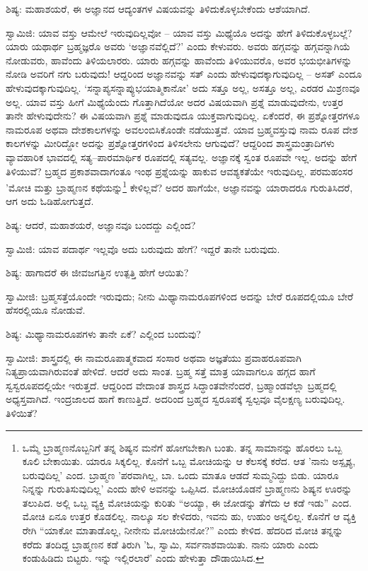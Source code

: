 ಶಿಷ್ಯ: ಮಹಾಶಯರೆ, ಈ ಅಜ್ಞಾನದ ಆದ್ಯಂತಗಳ ವಿಷಯವನ್ನು ತಿಳಿದುಕೊಳ್ಳಬೇಕೆಂದು ಆಶೆಯಾಗಿದೆ.

ಸ್ವಾಮಿಜಿ: ಯಾವ ವಸ್ತು ಆಮೇಲೆ ಇರುವುದಿಲ್ಲವೋ – ಯಾವ ವಸ್ತು ಮಿಥ್ಯೆಯೊ ಅದನ್ನು ಹೇಗೆ ತಿಳಿದುಕೊಳ್ಳಬಲ್ಲೆ? ಯಾರು ಯಥಾರ್ಥ ಬ್ರಹ್ಮಜ್ಞರೊ ಅವರು ‘ಅಜ್ಞಾನವೆಲ್ಲಿದೆ?’ ಎಂದು ಕೇಳುವರು. ಅವರು ಹಗ್ಗವನ್ನು ಹಗ್ಗವನ್ನಾಗಿಯೆ ನೋಡುವರು, ಹಾವೆಂದು ತಿಳಿಯಲಾರರು. ಯಾರು ಹಗ್ಗವನ್ನು ಹಾವೆಂದು ತಿಳಿಯುವರೊ, ಅವರ ಭಯಭೀತಿಗಳನ್ನು ನೋಡಿ ಅವರಿಗೆ ನಗು ಬರುವುದು! ಆದ್ದರಿಂದ ಅಜ್ಞಾನವನ್ನು ಸತ್ ಎಂದು ಹೇಳುವುದಕ್ಕಾಗುವುದಿಲ್ಲ – ಅಸತ್ ಎಂದೂ ಹೇಳುವುದಕ್ಕಾಗುವುದಿಲ್ಲ. ‘ಸನ್ನಾಪ್ಯಸನ್ನಾಪ್ಯುಭಯಾತ್ಮಿಕಾನೋ’ ಅದು ಸತ್ತೂ ಅಲ್ಲ, ಅಸತ್ತೂ ಅಲ್ಲ, ಎರಡರ ಮಿಶ್ರಣವೂ ಅಲ್ಲ. ಯಾವ ವಸ್ತು ಹೀಗೆ ಮಿಥ್ಯೆಯೆಂದು ಗೊತ್ತಾಗಿದೆಯೋ ಅದರ ವಿಷಯವಾಗಿ ಪ್ರಶ್ನೆ ಮಾಡುವುದೇನು, ಉತ್ತರ ತಾನೇ ಹೇಳುವುದೇನು? ಈ ವಿಷಯವಾಗಿ ಪ್ರಶ್ನೆ ಮಾಡುವುದೂ ಯುಕ್ತವಾಗುವುದಿಲ್ಲ. ಏಕೆಂದರೆ, ಈ ಪ್ರಶ್ನೋತ್ತರಗಳೂ ನಾಮರೂಪ ಅಥವಾ ದೇಶಕಾಲಗಳನ್ನು ಅವಲಂಬಿಸಿಕೊಂಡೇ ನಡೆಯುತ್ತವೆ. ಯಾವ ಬ್ರಹ್ಮವಸ್ತುವು ನಾಮ ರೂಪ ದೇಶ ಕಾಲಗಳನ್ನು ಮೀರಿದ್ದೋ ಅದನ್ನು ಪ್ರಶ್ನೋತ್ತರಗಳಿಂದ ತಿಳಿಸಲೇನು ಆಗುವುದೆ? ಆದ್ದರಿಂದ ಶಾಸ್ತ್ರಮಂತ್ರಾದಿಗಳು ವ್ಯಾವಹಾರಿಕ ಭಾವದಲ್ಲಿ ಸತ್ಯ–ಪಾರಮಾರ್ಥಿಕ ರೂಪದಲ್ಲಿ ಸತ್ಯವಲ್ಲ. ಅಜ್ಞಾನಕ್ಕೆ ಸ್ವಂತ ರೂಪವೇ ಇಲ್ಲ. ಅದನ್ನು ಹೇಗೆ ತಿಳಿಯುವೆ? ಬ್ರಹ್ಮದ ಪ್ರಕಾಶವಾದಾಗಂತೂ ಇಂಥ ಪ್ರಶ್ನೆಯನ್ನು ಹಾಕುವ ಆವಶ್ಯಕತೆಯೇ ಇರುವುದಿಲ್ಲ. ಪರಮಹಂಸರ 'ಮೋಚಿ ಮತ್ತು ಬ್ರಾಹ್ಮಣನ ಕಥೆಯನ್ನು\footnote{ಒಮ್ಮೆ ಬ್ರಾಹ್ಮಣನೊಬ್ಬನಿಗೆ ತನ್ನ ಶಿಷ್ಯನ ಮನೆಗೆ ಹೋಗಬೇಕಾಗಿ ಬಂತು. ತನ್ನ ಸಾಮಾನನ್ನು ಹೊರಲು ಒಬ್ಬ ಕೂಲಿ ಬೇಕಾಯಿತು. ಯಾರೂ ಸಿಕ್ಕಲಿಲ್ಲ. ಕೊನೆಗೆ ಒಬ್ಬ ಮೋಚಿಯನ್ನು ಆ ಕೆಲಸಕ್ಕೆ ಕರೆದ. ಆತ 'ನಾನು ಅಸ್ಪೃಶ್ಯ, ಬರುವುದಿಲ್ಲ' ಎಂದ. ಬ್ರಾಹ್ಮಣ 'ಪರವಾಗಿಲ್ಲ, ಬಾ. ಒಂದು ಮಾತೂ ಆಡದೆ ಸುಮ್ಮನಿದ್ದು ಬಿಡು. ಯಾರೂ ನಿನ್ನನ್ನು ಗುರುತಿಸುವುದಿಲ್ಲ' ಎಂದು ಹೇಳಿ ಅವನನ್ನು ಒಪ್ಪಿಸಿದ. ಮೋಚಿಯೊಡನೆ ಬ್ರಾಹ್ಮಣನು ಶಿಷ್ಯನ ಊರನ್ನು ತಲುಪಿದ. ಅಲ್ಲಿ ಒಬ್ಬ ವ್ಯಕ್ತಿ ಮೋಚಿಯನ್ನು ಕುರಿತು “ಅಯ್ಯಾ, ಈ ಜೋಡನ್ನು ತೆಗೆದು ಆ ಕಡೆ ಇಡು” ಎಂದ. ಮೋಚಿ ಏನೂ ಉತ್ತರ ಕೊಡಲಿಲ್ಲ. ನಾಲ್ಕೂ ಸಲ ಕೇಳಿದರು, ಇವನು ಹು, ಉಹುಂ ಅನ್ನಲಿಲ್ಲ. ಕೊನೆಗೆ ಆ ವ್ಯಕ್ತಿ ರೇಗಿ “ಯಾಕೋ ಮಾತಾಡೊಲ್ಲ, ನೀನೇನು ಮೋಚಿಯೇನೋ?” ಎಂದು ಕೇಳಿದ. ಹೆದರಿದ ಮೋಚಿ ತನ್ನನ್ನು ಕರೆದು ತಂದಿದ್ದ ಬ್ರಾಹ್ಮಣನ ಕಡೆ ತಿರುಗಿ 'ಓ, ಸ್ವಾಮಿ, ಸರ್ವನಾಶವಾಯಿತು. ನಾನು ಯಾರು ಎಂದು ಕಂಡುಹಿಡಿದು ಬಿಟ್ಟರು. ಇನ್ನು ಇಲ್ಲಿರಲಾರೆ' ಎಂದು ಹೇಳುತ್ತಾ ದೌಡಾಯಿಸಿದ.} ಕೇಳಿಲ್ಲವೆ? ಅದರ ಹಾಗೆಯೇ, ಅಜ್ಞಾನವನ್ನು ಯಾರಾದರೂ ಗುರುತಿಸಿದರೆ, ಆಗ ಅದು ಓಡಿಹೋಗುತ್ತದೆ.

ಶಿಷ್ಯ: ಆದರೆ, ಮಹಾಶಯರೆ, ಅಜ್ಞಾನವೂ ಬಂದದ್ದು ಎಲ್ಲಿಂದ?

ಸ್ವಾಮಿಜಿ: ಯಾವ ಪದಾರ್ಥ ಇಲ್ಲವೊ ಅದು ಬರುವುದು ಹೇಗೆ? ಇದ್ದರೆ ತಾನೇ ಬರುವುದು.

ಶಿಷ್ಯ: ಹಾಗಾದರೆ ಈ ಜೀವಜಗತ್ತಿನ ಉತ್ಪತ್ತಿ ಹೇಗೆ ಆಯಿತು?

ಸ್ವಾಮೀಜಿ: ಬ್ರಹ್ಮಸತ್ತೆಯೊಂದೇ ಇರುವುದು; ನೀನು ಮಿಥ್ಯಾನಾಮರೂಪಗಳಿಂದ ಅದನ್ನು ಬೇರೆ ರೂಪದಲ್ಲಿಯೂ ಬೇರೆ ಹೆಸರಲ್ಲಿಯೂ ನೋಡುವೆ.

ಶಿಷ್ಯ: ಮಿಥ್ಯಾನಾಮರೂಪಗಳು ತಾನೇ ಏಕೆ? ಎಲ್ಲಿಂದ ಬಂದುವು?

ಸ್ವಾಮೀಜಿ: ಶಾಸ್ತ್ರದಲ್ಲಿ ಈ ನಾಮರೂಪಾತ್ಮಕವಾದ ಸಂಸಾರ ಅಥವಾ ಅಜ್ಞತೆಯು ಪ್ರವಾಹರೂಪವಾಗಿ ನಿತ್ಯಪ್ರಾಯವಾಗಿರುವಂತೆ ಹೇಳಿದೆ. ಆದರೆ ಅದು ಸಾಂತ. ಬ್ರಹ್ಮ ಸತ್ತೆ ಮಾತ್ರ ಯಾವಾಗಲೂ ಹಗ್ಗದ ಹಾಗೆ ಸ್ವಸ್ವರೂಪದಲ್ಲಿಯೇ ಇರುತ್ತದೆ. ಆದ್ದರಿಂದ ವೇದಾಂತ ಶಾಸ್ತ್ರದ ಸಿದ್ಧಾಂತವೇನೆಂದರೆ, ಬ್ರಹ್ಮಾಂಡವೆಲ್ಲಾ ಬ್ರಹ್ಮದಲ್ಲಿ ಅಧ್ಯಸ್ತವಾಗಿದೆ. ಇಂದ್ರಜಾಲದ ಹಾಗೆ ಕಾಣುತ್ತಿದೆ. ಅದರಿಂದ ಬ್ರಹ್ಮದ ಸ್ವರೂಪಕ್ಕೆ ಸ್ವಲ್ಪವೂ ವೈಲಕ್ಷಣ್ಯ ಬರುವುದಿಲ್ಲ. ತಿಳಿಯಿತೆ?

